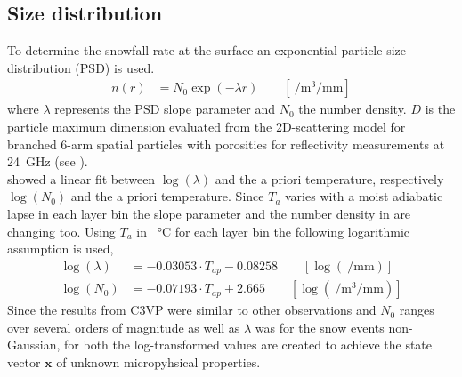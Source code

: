 \subsection{Size distribution} \label{sec:size_dist}
To determine the snowfall rate at the surface an exponential particle size distribution (PSD) is used. 
\begin{align}
	n(r) & = N_{0} \exp\left(-\lambda r\right) \qquad [ \SI{}{\per\cubic\metre\per\mm} ] \label{eq:num_dens}
\end{align}
where $\lambda$ represents the PSD slope parameter and $N_{0}$ the number density. $D$ is the particle maximum dimension evaluated from the 2D-scattering model for branched 6-arm spatial particles with porosities for reflectivity measurements at \SI{24}{\giga\Hz} (see ).
\\
\cite{wood_estimation_2011} showed a linear fit between $\log(\lambda)$ and the a priori temperature, respectively $\log(N_0)$ and the a priori temperature.
Since $T_{a}$ varies with a moist adiabatic lapse in each layer bin the slope parameter and the number density in   are changing too. Using $T_{a}$ in \SI{}{\celsius} for each layer bin the following logarithmic assumption is used,
\begin{align}
	\log(\lambda) & = -0.03053 \cdot T_{ap} - 0.08258  \label{eq:lambda} \qquad [ \log(\SI{}{\per\mm}) ]\\
	\log(N_0) & = -0.07193 \cdot T_{ap} +2.665  \qquad [ \log(\SI{}{\per\cubic\metre\per\mm})]
	\label{eq:N0}
\end{align}
Since the results from C3VP were similar to other observations and $N_0$ ranges over several orders of magnitude as well as $\lambda$ was for the snow events non-Gaussian, for both the log-transformed values are created to achieve the state vector $\mathbf{x}$ of unknown micropyhsical properties.
